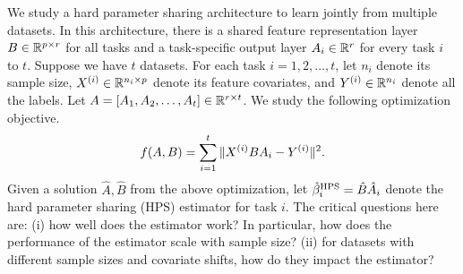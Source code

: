 We study a hard parameter sharing architecture to learn jointly from multiple datasets.
In this architecture, there is a shared feature representation layer $B\in\mathbb{R}^{p\times r}$ for all tasks and a task-specific output layer $A_i \in \mathbb{R}^r$ for every task $i$ to $t$.
Suppose we have $t$ datasets.
For each task $i = 1, 2, \dots, t$, let $n_i$ denote its sample size, $X^{(i)} \in \mathbb{R}^{n_i \times p}$ denote its feature covariates, and $Y^{(i)} \in \mathbb{R}^{n_i}$ denote all the labels.
Let $A = [A_1, A_2, \dots, A_t] \in \mathbb{R}^{r \times t}$.
We study the following optimization objective.
\begin{align}\label{eq_mtl}
			f(A, B) = \sum_{i=1}^t \|X^{(i)} B A_i - Y^{(i)}\|^2.
\end{align}
Given a solution $\hat{A}, \hat{B}$ from the above optimization, let $\hat{\beta}_i^{\textup{HPS}} = \hat{B} \hat{A}_i$ denote the hard parameter sharing (HPS) estimator for task $i$.
The critical questions here are:
(i) how well does the estimator work? In particular, how does the performance of the estimator scale with sample size?
(ii) for datasets with different sample sizes and covariate shifts, how do they impact the estimator?


